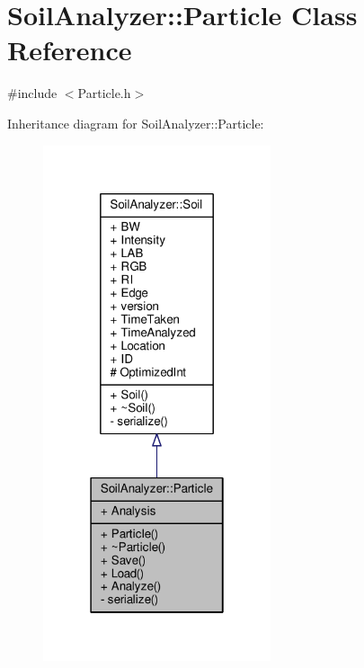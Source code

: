 \hypertarget{class_soil_analyzer_1_1_particle}{}\section{Soil\+Analyzer\+:\+:Particle Class Reference}
\label{class_soil_analyzer_1_1_particle}


{\ttfamily \#include $<$Particle.\+h$>$}



Inheritance diagram for Soil\+Analyzer\+:\+:Particle\+:\nopagebreak
\begin{figure}[H]
\begin{center}
\leavevmode
\includegraphics[width=190pt]{class_soil_analyzer_1_1_particle__inherit__graph}
\end{center}
\end{figure}


